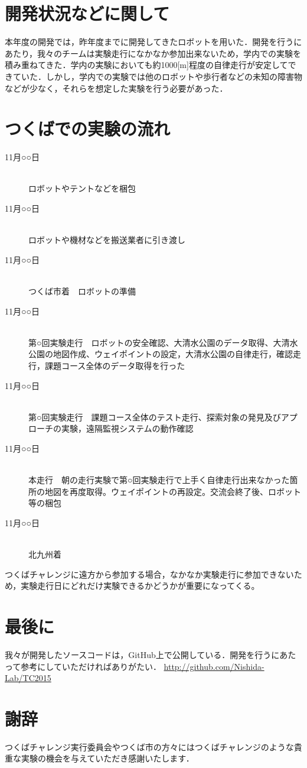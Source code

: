 \documentclass[10pt,a4paper]{jarticle}
\begin{document}
\section{開発状況などに関して}
本年度の開発では，昨年度までに開発してきたロボットを用いた．開発を行うにあたり，我々のチームは実験走行になかなか参加出来ないため，学内での実験を積み重ねてきた．学内の実験においても約1000[m]程度の自律走行が安定してできていた．しかし，学内での実験では他のロボットや歩行者などの未知の障害物などが少なく，それらを想定した実験を行う必要があった．

\section{つくばでの実験の流れ}
\begin{description}
 \item[11月○○日]\mbox{}\\
	    ロボットやテントなどを梱包
 \item[11月○○日]\mbox{}\\
	    ロボットや機材などを搬送業者に引き渡し
 \item[11月○○日]\mbox{}\\
	    つくば市着　ロボットの準備
 \item[11月○○日]\mbox{}\\
	    第○回実験走行　ロボットの安全確認、大清水公園のデータ取得、大清水公園の地図作成、ウェイポイントの設定，大清水公園の自律走行，確認走行，課題コース全体のデータ取得を行った
 \item[11月○○日]\mbox{}\\
	    第○回実験走行　課題コース全体のテスト走行、探索対象の発見及びアプローチの実験，遠隔監視システムの動作確認
 \item[11月○○日]\mbox{}\\
	    本走行　朝の走行実験で第○回実験走行で上手く自律走行出来なかった箇所の地図を再度取得。ウェイポイントの再設定。交流会終了後、ロボット等の梱包
 \item[11月○○日]\mbox{}\\
	    北九州着
\end{description}
つくばチャレンジに遠方から参加する場合，なかなか実験走行に参加できないため，実験走行日にどれだけ実験できるかどうかが重要になってくる。

\section{最後に}
我々が開発したソースコードは，GitHub上で公開している．開発を行うにあたって参考にしていただければありがたい．
\url{http://github.com/Nishida-Lab/TC2015}

\section*{謝辞}
つくばチャレンジ実行委員会やつくば市の方々にはつくばチャレンジのような貴重な実験の機会を与えていただき感謝いたします．
\end{document}

